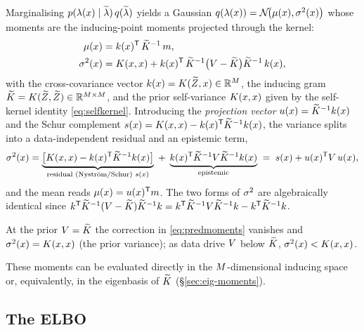 Marginalising $p(\lambda(x)\mid\widetilde{\lambda})\,q(\widetilde{\lambda})$ yields a Gaussian
$q(\lambda(x))=\mathcal{N}\!\big(\mu(x),\sigma^{2}(x)\big)$ whose moments are the
inducing-point moments projected through the kernel:
\begin{align}
  \mu(x)  &= k(x)^{\mathsf{T}}\,\widetilde{K}^{-1}\,m , \notag\\
  \sigma^{2}(x)   &= K(x,x) + k(x)^{\mathsf{T}}\,\widetilde{K}^{-1}\big(V-\widetilde{K}\big)\widetilde{K}^{-1}\,k(x),
  \label{eq:predmoments}
\end{align}
with the cross-covariance vector $k(x)=K(\widetilde{Z},x)\in\mathbb{R}^{M}$, the
inducing gram $\widetilde{K}=K(\widetilde{Z},\widetilde{Z})\in\mathbb{R}^{M\times M}$, and the prior
self-variance $K(x,x)$ given by the self-kernel identity \eqref{eq:selfkernel}.
Introducing the \emph{projection vector} $u(x)=\widetilde{K}^{-1}k(x)$ and the
Schur complement $s(x)=K(x,x)-k(x)^{\mathsf{T}}\widetilde{K}^{-1}k(x)$, the
variance splits into a data-independent residual and an epistemic term,
\begin{equation}
  \sigma^{2}(x)=\underbrace{\big[K(x,x)-k(x)^{\mathsf{T}}\widetilde{K}^{-1}k(x)\big]}_{\text{residual (Nystr\"om/Schur) }s(x)}
    \;+\;\underbrace{k(x)^{\mathsf{T}}\widetilde{K}^{-1}V\widetilde{K}^{-1}k(x)}_{\text{epistemic}}
    \;=\; s(x)+u(x)^{\mathsf{T}}V\,u(x),
  \label{eq:varsplit}
\end{equation}
and the mean reads $\mu(x)=u(x)^{\mathsf{T}}m$. The two forms of $\sigma^{2}$ are
algebraically identical since
$k^{\mathsf{T}}\widetilde{K}^{-1}(V-\widetilde{K})\widetilde{K}^{-1}k=k^{\mathsf{T}}\widetilde{K}^{-1}V\widetilde{K}^{-1}k-k^{\mathsf{T}}\widetilde{K}^{-1}k$.

\begin{remark}
At the prior $V=\widetilde{K}$ the correction in \eqref{eq:predmoments} vanishes and
$\sigma^{2}(x)=K(x,x)$ (the prior variance); as data drive $V$ below $\widetilde{K}$,
$\sigma^{2}(x)<K(x,x)$.
\end{remark}

These moments can be evaluated directly in the $M$-dimensional inducing
space or, equivalently, in the eigenbasis of $\widetilde{K}$ (\S\ref{sec:eig-moments}).

\subsection{The ELBO}\label{sec:elbo}

